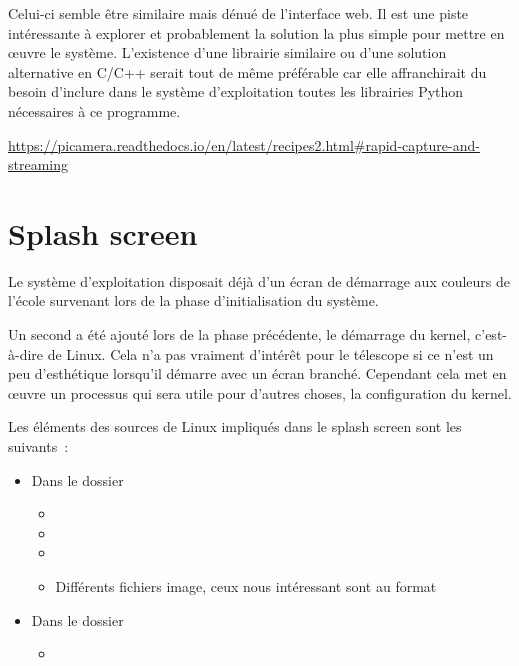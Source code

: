 \vspace{1cm}

Celui-ci semble être similaire mais dénué de l'interface web. Il est une piste intéressante à explorer et probablement la solution la plus simple pour mettre en œuvre le système. L'existence d'une librairie similaire ou d'une solution alternative en C/C++ serait tout de même préférable car elle affranchirait du besoin d'inclure dans le système d'exploitation toutes les librairies Python nécessaires à ce programme.

\url{https://picamera.readthedocs.io/en/latest/recipes2.html#rapid-capture-and-streaming}

\section{Splash screen}

Le système d'exploitation disposait déjà d'un écran de démarrage aux couleurs de l'école survenant lors de la phase d'initialisation du système.

Un second a été ajouté lors de la phase précédente, le démarrage du kernel, c'est-à-dire de Linux. Cela n'a pas vraiment d'intérêt pour le télescope si ce n'est un peu d'esthétique lorsqu'il démarre avec un écran branché. Cependant cela met en œuvre un processus qui sera utile pour d'autres choses, la configuration du kernel.

\vspace{1cm}

Les éléments des sources de Linux impliqués dans le splash screen sont les suivants~:
\begin{itemize}[label=$\bullet$]
	\item Dans le dossier 
	\begin{itemize}
		\item {}
		\item {}
		\item {}
		\item Différents fichiers image, ceux nous intéressant sont au format 
		\end{itemize}
	\item Dans le dossier 
	\begin{itemize}
		\item {}
		\end{itemize}
	\end{itemize}

